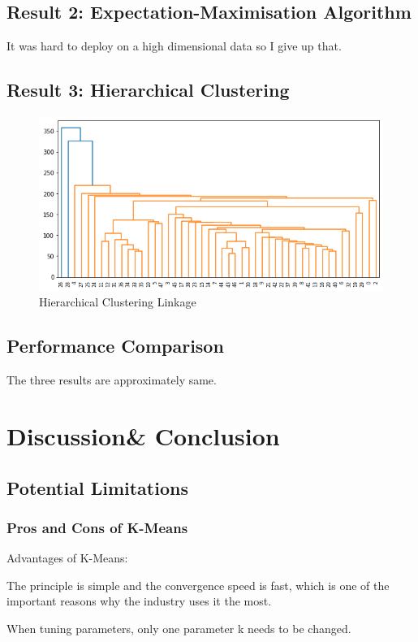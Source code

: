 \documentclass[11pt]{report}
\begin{document}
\subsection{Result 2: Expectation-Maximisation Algorithm}
It was hard to deploy on a high dimensional data so I give up that.

\subsection{Result 3: Hierarchical Clustering}
\begin{figure}[h]
     \centering
     \includegraphics[width = \linewidth]{hc.png}
     \caption{Hierarchical Clustering Linkage}\label{fig:hc}
\end{figure}
\subsection{Performance Comparison}
The three results are approximately same.

\section{Discussion\& Conclusion}
\subsection{Potential Limitations}
\subsubsection{Pros and Cons of K-Means}
Advantages of K-Means:

The principle is simple and the convergence speed is fast, which is one of the important reasons why the industry uses it the most.

When tuning parameters, only one parameter k needs to be changed.
\end{document}
